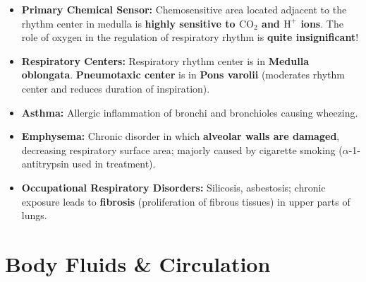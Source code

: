 \documentclass[10pt,a4paper]{article}
\begin{document}
\begin{trapbox}
\begin{itemize}
  \item \textbf{Primary Chemical Sensor:} Chemosensitive area located adjacent to the rhythm center in medulla is \textbf{highly sensitive to $\mathrm{CO}_2$ and $\mathrm{H}^+$ ions}. The role of oxygen in the regulation of respiratory rhythm is \textbf{quite insignificant}!
  \item \textbf{Respiratory Centers:} Respiratory rhythm center is in \textbf{Medulla oblongata}. \textbf{Pneumotaxic center} is in \textbf{Pons varolii} (moderates rhythm center and reduces duration of inspiration).
  \item \textbf{Asthma:} Allergic inflammation of bronchi and bronchioles causing wheezing.
  \item \textbf{Emphysema:} Chronic disorder in which \textbf{alveolar walls are damaged}, decreasing respiratory surface area; majorly caused by cigarette smoking ($\alpha$-1-antitrypsin used in treatment).
  \item \textbf{Occupational Respiratory Disorders:} Silicosis, asbestosis; chronic exposure leads to \textbf{fibrosis} (proliferation of fibrous tissues) in upper parts of lungs.
\end{itemize}
\end{trapbox}

\section{Body Fluids \& Circulation}
\end{document}
